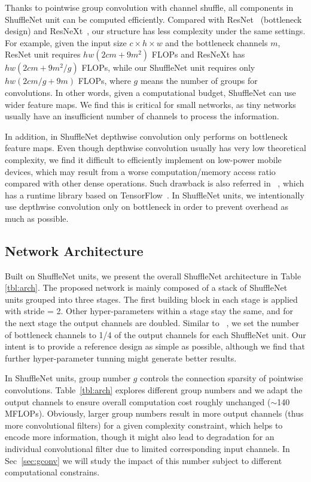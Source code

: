 \documentclass[10pt,twocolumn,letterpaper]{article}
\begin{document}
Thanks to pointwise group convolution with channel shuffle, all components in ShuffleNet unit can be computed efficiently. Compared with ResNet~\cite{he2016deep} (bottleneck design) and ResNeXt~\cite{xie2016aggregated}, our structure has less complexity under the same settings. For example, given the input size $c\times h \times w$ and the bottleneck channels $m$, ResNet unit requires $hw(2cm+9m^2)$ FLOPs and ResNeXt has $hw(2cm+9m^2/g)$ FLOPs, while our ShuffleNet unit requires only $hw(2cm/g+9m)$ FLOPs, where $g$ means the number of groups for convolutions. In other words, given a computational budget, ShuffleNet can use wider feature maps. We find this is critical for small networks, as tiny networks usually have an insufficient number of channels to process the information.

In addition, in ShuffleNet depthwise convolution only performs on bottleneck feature maps. Even though depthwise convolution usually has very low theoretical complexity, we find it difficult to efficiently implement on low-power mobile devices, which may result from a worse computation/memory access ratio compared with other dense operations. Such drawback is also referred in ~\cite{chollet2016xception}, which has a runtime library based on TensorFlow~\cite{abadi2016tensorflow}. In ShuffleNet units, we intentionally use depthwise convolution only on bottleneck in order to prevent overhead as much as possible.


\subsection{Network Architecture}

Built on ShuffleNet units, we present the overall ShuffleNet architecture in Table \ref{tbl:arch}. The proposed network is mainly composed of a stack of ShuffleNet units grouped into three stages. The first building block in each stage is applied with stride = 2. Other hyper-parameters within a stage stay the same, and for the next stage the output channels are doubled. Similar to ~\cite{he2016deep}, we set the number of bottleneck channels to 1/4 of the output channels for each ShuffleNet unit. Our intent is to provide a reference design as simple as possible, although we find that further hyper-parameter tunning might generate better results. 



In ShuffleNet units, group number $g$ controls the connection sparsity of pointwise convolutions. Table~\ref{tbl:arch} explores different group numbers and we adapt the output channels to ensure overall computation cost roughly unchanged ($\sim$140 MFLOPs). Obviously, larger group numbers result in more output channels (thus more convolutional filters) for a given complexity constraint, which helps to encode more information, though it might also lead to degradation for an individual convolutional filter due to limited corresponding input channels. In Sec~\ref{sec:gconv} we will study the impact of this number subject to different computational constrains.
\end{document}
